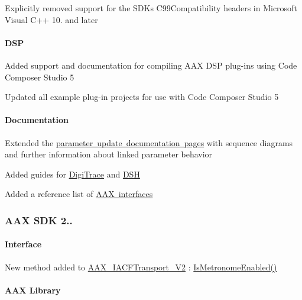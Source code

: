 \begin{DoxyItemize}
\item Explicitly removed support for the S\+DK\textquotesingle{}s C99\+Compatibility headers in Microsoft Visual C++ 10. and later 
\end{DoxyItemize}\hypertarget{a00847_aax_sdk_2p1p1_DSP}{}\paragraph{D\+SP}\label{a00847_aax_sdk_2p1p1_DSP}

\begin{DoxyItemize}
\item Added support and documentation for compiling A\+AX D\+SP plug-\/ins using Code Composer Studio 5 
\item Updated all example plug-\/in projects for use with Code Composer Studio 5 
\end{DoxyItemize}\hypertarget{a00847_aax_sdk_2p1p1_Documentation}{}\paragraph{Documentation}\label{a00847_aax_sdk_2p1p1_Documentation}

\begin{DoxyItemize}
\item Extended the \mbox{\hyperlink{a00820}{parameter update documentation pages}} with sequence diagrams and further information about linked parameter behavior 
\item Added guides for \mbox{\hyperlink{a00834}{Digi\+Trace}} and \mbox{\hyperlink{a00835}{D\+SH}} 
\item Added a reference list of \mbox{\hyperlink{a00844}{A\+AX interfaces}} 
\end{DoxyItemize}\hypertarget{a00847_aax_sdk_2p1p0}{}\subsubsection{A\+A\+X S\+D\+K 2..}\label{a00847_aax_sdk_2p1p0}
\hypertarget{a00847_aax_sdk_2p1p0_Interface}{}\paragraph{Interface}\label{a00847_aax_sdk_2p1p0_Interface}

\begin{DoxyItemize}
\item New method added to \mbox{\hyperlink{a01761}{A\+A\+X\+\_\+\+I\+A\+C\+F\+Transport\+\_\+\+V2}} \+: \mbox{\hyperlink{a01761_a64bc3e6707297e32190e7aa290513521}{Is\+Metronome\+Enabled()}} 
\end{DoxyItemize}\hypertarget{a00847_aax_sdk_2p1p0_AAXLibrary}{}\paragraph{A\+A\+X Library}\label{a00847_aax_sdk_2p1p0_AAXLibrary}

